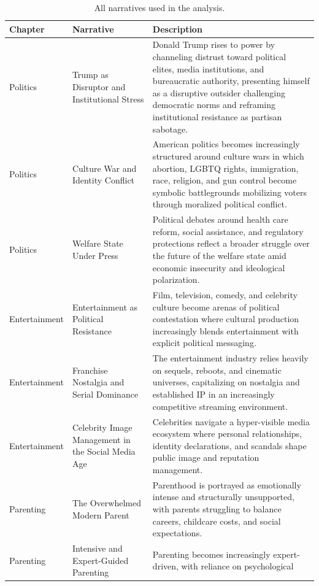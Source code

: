 \documentclass[
  journal=medium,
  manuscript=article-type,
  year=2025,
  volume=1,
]{cup-journal}
\begin{document}
\begin{table}[hbt!]
\begin{threeparttable}
\caption{All narratives used in the analysis.}
\label{tab:narratives}
\begin{tabular}{llp{6cm}}
\toprule
\headrow Chapter & Narrative & Description \\
\midrule
Politics
  & Trump as Disruptor and Institutional Stress
  & Donald Trump rises to power by channeling distrust toward political elites,
    media institutions, and bureaucratic authority, presenting himself as a disruptive
    outsider challenging democratic norms and reframing institutional resistance as
    partisan sabotage. \\
Politics
  & Culture War and Identity Conflict
  & American politics becomes increasingly structured around culture wars in which
    abortion, LGBTQ rights, immigration, race, religion, and gun control become
    symbolic battlegrounds mobilizing voters through moralized political conflict. \\
Politics
  & Welfare State Under Press
  & Political debates around health care reform, social assistance, and regulatory
    protections reflect a broader struggle over the future of the welfare state amid
    economic insecurity and ideological polarization. \\
\addlinespace
Entertainment
  & Entertainment as Political Resistance
  & Film, television, comedy, and celebrity culture become arenas of political
    contestation where cultural production increasingly blends entertainment with
    explicit political messaging. \\
Entertainment
  & Franchise Nostalgia and Serial Dominance
  & The entertainment industry relies heavily on sequels, reboots, and cinematic
    universes, capitalizing on nostalgia and established IP in an increasingly
    competitive streaming environment. \\
Entertainment
  & Celebrity Image Management in the Social Media Age
  & Celebrities navigate a hyper-visible media ecosystem where personal relationships,
    identity declarations, and scandals shape public image and reputation management. \\
\addlinespace
Parenting
  & The Overwhelmed Modern Parent
  & Parenthood is portrayed as emotionally intense and structurally unsupported,
    with parents struggling to balance careers, childcare costs, and social expectations. \\
Parenting
  & Intensive and Expert-Guided Parenting
  & Parenting becomes increasingly expert-driven, with reliance on psychological

\end{tabular}
\end{threeparttable}
\end{table}
\end{document}
